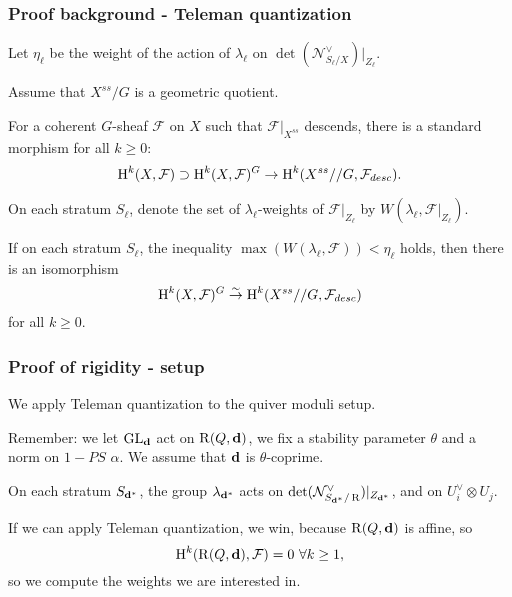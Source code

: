 \documentclass{beamer}
\begin{document}
\begin{frame}
    \frametitle{Proof background - Teleman quantization}
Let $\eta_{\ell}$ be the weight of the action of $\lambda_{\ell}$ on
$\det(\mathcal{N}^{\vee}_{S_{\ell}/X})|_{Z_{\ell}}$. \pause

Assume that $X^{ss}/G$ is a geometric quotient. \pause

For a coherent $G$-sheaf $\mathcal{F}$ on $X$ 
such that $\mathcal{F}|_{X^{ss}}$ descends,
there is a standard morphism for all $k \geq 0$:
\[ \HH^k(X, \mathcal{F}) \supset \HH^{k}(X, \mathcal{F})^{G} \to \HH^{k}(X^{ss} // G, \mathcal{F}_{desc}).\] \pause

On each stratum $S_{\ell}$,
denote the set of $\lambda_{\ell}$-weights of $\mathcal{F}|_{Z_\ell}$
by $W(\lambda_{\ell}, \mathcal{F}|_{Z_\ell})$. \pause
\begin{theorem}

If on each stratum $S_{\ell}$, the inequality $\max(W(\lambda_{\ell}, \mathcal{F})) < \eta_{\ell}$
holds, then there is an isomorphism
\[\HH^{k}(X, \mathcal{F})^{G} \to[\sim] \HH^{k}(X^{ss} // G, \mathcal{F}_{desc})\]
for all $k \geq 0$.
\end{theorem}

\end{frame}

\begin{frame}
    \frametitle{Proof of rigidity - setup}
We apply Teleman quantization to the quiver moduli setup. \pause

Remember: we let $\group$ act on $\parameterspace(Q, \tuple{d})$,
we fix a stability parameter $\theta$ and a norm on $1-PS$ $\alpha$. \pause
We assume that $\tuple{d}$ is $\theta$-coprime.

On each stratum $S_{\tuple{d}^*}$, the group $\lambda_{\tuple{d}^*}$
acts on $\det(\mathcal{N}^{\vee}_{S_{\tuple{d}^*}/\parameterspace})|_{Z_{\tuple{d}^*}}$, \pause
and on ${U}^{\vee}_i \otimes {U}_j$. \pause

If we can apply Teleman quantization, we win, because $\parameterspace(Q, \tuple{d})$ is affine, so
\[\HH^k(\parameterspace(Q, \tuple{d}), \mathcal{F}) = 0 ~\forall k \geq 1,\]
so we compute the weights we are interested in.
\end{frame}
\end{document}
